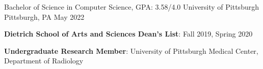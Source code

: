 
\begin{cventries}
  \cventry
    {Bachelor of Science in Computer Science, GPA: 3.58/4.0} %
    {University of Pittsburgh} %
    {Pittsburgh, PA} %
    {May 2022} %
    {
      \begin{cvitems} %
         \item {\textbf{Dietrich School of Arts and Sciences Dean's List}: Fall 2019, Spring 2020}
         \vspace{0.5mm}
         \item {\textbf{Undergraduate Research Member}: University of Pittsburgh Medical Center, Department of Radiology}
      \end{cvitems}
    }
\end{cventries}
